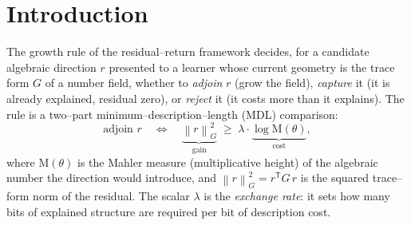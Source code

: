 \documentclass[11pt]{article}
\theoremstyle{plain}
\theoremstyle{definition}
\theoremstyle{remark}
\newcommand{\Mah}{\mathrm{M}}
\newcommand{\norm}[1]{\left\lVert #1 \right\rVert}
\begin{document}
\begin{abstract}
co--locate at $D=0$. Finally, because the discipline requires $C$ to remain dynamical and unpinned (freezing $C$ freezes $\lambda$ by the back door), the flip boundary $D=0$ must be carried as a \emph{handled dynamical state}, not assumed unreachable: under a real coherence flow $D=4z^2 \ge 0$ is a perfect square and is never crossed, but the rotation branch $D<0$ is a genuine algebraic regime that the computation must be prepared to enter --- in the eigenframe, where the marginal channel evolves in imaginary time. Finally, we resolve the construction's last open frontier --- the reciprocal--seed cost floor: the seeds and operations form a finitely generated \emph{emission algebra}, and a companion paper's Emission--Gap Theorem shows its image contains no Salem number, so the cost floor is $\lambda\log\varphi>0$, forced and uniform at every size --- the Salem regime being exactly the fourth channel the ternary trifurcation has no slot for, while general Lehmer remains untouched and is not needed. Every load--bearing identity is machine--verified in exact arithmetic.
\end{abstract}

\tableofcontents

\section{Introduction}\label{sec:intro}

The growth rule of the residual--return framework decides, for a candidate algebraic direction $r$ presented to a learner whose current geometry is the trace form $G$ of a number field, whether to \emph{adjoin} $r$ (grow the field), \emph{capture} it (it is already explained, residual zero), or \emph{reject} it (it costs more than it explains). The rule is a two--part minimum--description--length (MDL) comparison:
\begin{equation}\label{eq:rule}
\text{adjoin } r \quad\Longleftrightarrow\quad \underbrace{\norm{r}^2_G}_{\text{gain}} \;\ge\; \lambda \cdot \underbrace{\log \Mah(\theta)}_{\text{cost}},
\end{equation}
where $\Mah(\theta)$ is the Mahler measure (multiplicative height) of the algebraic number the direction would introduce, and $\norm{r}^2_G = r^{\mathsf T} G\, r$ is the squared trace--form norm of the residual. The scalar $\lambda$ is the \emph{exchange rate}: it sets how many bits of explained structure are required per bit of description cost.
\end{document}
